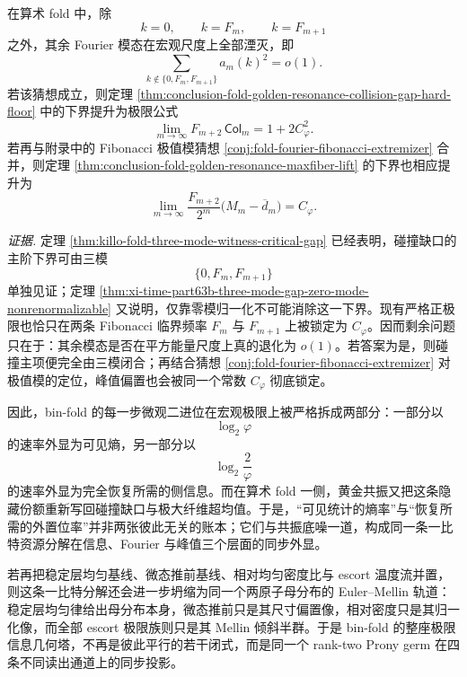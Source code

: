 \begin{conjecture}[共振三模完备性]\label{conj:conclusion-fold-three-mode-completeness}
在算术 fold 中，除
\[
k=0,\qquad k=F_m,\qquad k=F_{m+1}
\]
之外，其余 Fourier 模态在宏观尺度上全部湮灭，即
\[
\sum_{k\notin\{0,F_m,F_{m+1}\}} a_m(k)^2=o(1).
\]
若该猜想成立，则定理 \ref{thm:conclusion-fold-golden-resonance-collision-gap-hard-floor} 中的下界提升为极限公式
\[
\lim_{m\to\infty}F_{m+2}\,\mathsf{Col}_m
=
1+2C_\varphi^2.
\]
若再与附录中的 Fibonacci 极值模猜想 \ref{conj:fold-fourier-fibonacci-extremizer} 合并，则定理 \ref{thm:conclusion-fold-golden-resonance-maxfiber-lift} 的下界也相应提升为
\[
\lim_{m\to\infty}\frac{F_{m+2}}{2^m}\bigl(M_m-\overline d_m\bigr)
=
C_\varphi.
\]
\end{conjecture}

\noindent\emph{证据.}
定理 \ref{thm:killo-fold-three-mode-witness-critical-gap} 已经表明，碰撞缺口的主阶下界可由三模
\[
\{0,F_m,F_{m+1}\}
\]
单独见证；定理 \ref{thm:xi-time-part63b-three-mode-gap-zero-mode-nonrenormalizable} 又说明，仅靠零模归一化不可能消除这一下界。现有严格正极限也恰只在两条 Fibonacci 临界频率 \(F_m\) 与 \(F_{m+1}\) 上被锁定为 \(C_\varphi\)。因而剩余问题只在于：其余模态是否在平方能量尺度上真的退化为 \(o(1)\)。若答案为是，则碰撞主项便完全由三模闭合；再结合猜想 \ref{conj:fold-fourier-fibonacci-extremizer} 对极值模的定位，峰值偏置也会被同一个常数 \(C_\varphi\) 彻底锁定。

\noindent
因此，bin-fold 的每一步微观二进位在宏观极限上被严格拆成两部分：一部分以
\[
\log_2\varphi
\]
的速率外显为可见熵，另一部分以
\[
\log_2\frac{2}{\varphi}
\]
的速率外显为完全恢复所需的侧信息。而在算术 fold 一侧，黄金共振又把这条隐藏份额重新写回碰撞缺口与极大纤维超均值。于是，“可见统计的熵率”与“恢复所需的外置位率”并非两张彼此无关的账本；它们与共振底噪一道，构成同一条一比特资源分解在信息、Fourier 与峰值三个层面的同步外显。

若再把稳定层均匀基线、微态推前基线、相对均匀密度比与 escort 温度流并置，则这条一比特分解还会进一步坍缩为同一个两原子母分布的 Euler--Mellin 轨道：稳定层均匀律给出母分布本身，微态推前只是其尺寸偏置像，相对密度只是其归一化像，而全部 escort 极限族则只是其 Mellin 倾斜半群。于是 bin-fold 的整座极限信息几何塔，不再是彼此平行的若干闭式，而是同一个 rank-two Prony germ 在四条不同读出通道上的同步投影。






\endinput
